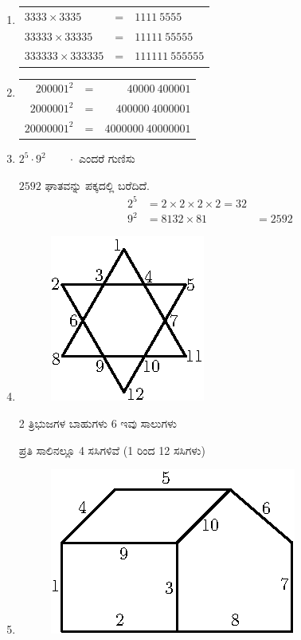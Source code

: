 \begin{enumerate}
\item
\begin{tabular}[t]{lcl}
$3333\times 3335$ & = & $1111~5555$\\
$33333\times 33335$ & = & $11111~55555$\\
$333333\times 333335$ & = & $111111~555555$
\end{tabular}

\item
\begin{tabular}[t]{rcr}
$200001^{2}$ & = & $40000~400001$\\
$2000001^{2}$ & = & $400000~4000001$\\
$20000001^{2}$ & = & $4000000~40000001$
\end{tabular}

\item $2^{5} \cdot 9^{2}\qquad \cdot$ ಎಂದರೆ ಗುಣಿಸು

$2592$ ಘಾತವನ್ನು ಪಕ್ಕದಲ್ಲಿ ಬರೆದಿದೆ. 
\begin{align*}
2^{5} & = 2\times 2\times 2\times 2 = 32\\
9^{2} & = 81
32\times 81 & = 2592
\end{align*}

\item
\begin{figure}[!h]
\centering
\includegraphics{images/chap5/ans18.eps}
\end{figure}

2 ತ್ರಿಭುಜಗಳ ಬಾಹುಗಳು 6 ಇವು ಸಾಲುಗಳು 

ಪ್ರತಿ ಸಾಲಿನಲ್ಲೂ 4 ಸಸಿಗಳಿವೆ (1 ರಿಂದ 12 ಸಸಿಗಳು)

\item
\begin{figure}[!h]
\centering
\includegraphics{images/chap5/q19.eps}
\end{figure}


\end{enumerate}
